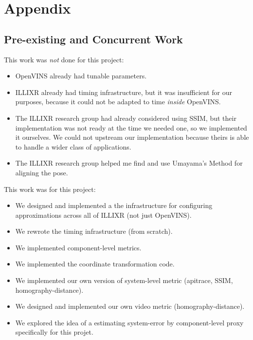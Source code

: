 \documentclass[screen,sigconf,nonacm]{acmart}
\begin{document}



\section{Appendix}

\subsection{Pre-existing and Concurrent Work}
This work was \textit{not} done for this project:

\begin{itemize}
\item OpenVINS already had tunable parameters.
\item ILLIXR already had timing infrastructure, but it was insufficient for our purposes, because it could not be adapted to time \textit{inside} OpenVINS.
\item The ILLIXR research group had already considered using SSIM, but their implementation was not ready at the time we needed one, so we implemented it ourselves. We could not upstream our implementation because theirs is able to handle a wider class of applications.
\item The ILLIXR research group helped me find and use Umayama's Method for aligning the pose.
\end{itemize}

This work was for this project:

\begin{itemize}
\item We designed and implemented a the infrastructure for configuring approximations across all of ILLIXR (not just OpenVINS).
\item We rewrote the timing infrastructure (from scratch).
\item We implemented component-level metrics.
\item We implemented the coordinate transformation code.
\item We implemented our own version of system-level metric (apitrace, SSIM, homography-distance).
\item We designed and implemented our own video metric (homography-distance).
\item We explored the idea of a estimating system-error by component-level proxy specifically for this projet.
\end{itemize}
\end{document}

